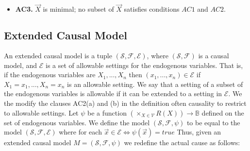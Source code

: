 \documentclass{article}
\begin{document}
\begin{definition}
\begin{itemize}
              (a) $(M,\vec u)\models \langle \vec X \leftarrow \vec x', \vec W \leftarrow \vec w' \rangle \neg \varphi$.

              (b) $(M,\vec u)\models[\vec X\leftarrow \vec x, \vec W' \leftarrow \vec w', \vec Z'\leftarrow \vec z^*]\varphi$ for all subsets $\vec W'$ of $\vec W$ and all subsets $Z'$ of $\vec Z$.

        \item  \textbf{AC3.} $\vec X$ is minimal; no subset of $\vec X$ satisfies conditions $AC1$ and $AC2$.
    \end{itemize}
\end{definition}

\subsection{Extended Causal Model}
An extended causal model is a tuple $(\mathcal{S},\mathcal{F},
    \mathcal{E})$, where $(\mathcal{S},\mathcal{F})$ is a causal model, and $\mathcal{E}$ is a set of allowable settings for the endogenous variables.
That is, if the endogenous variables are $X_1,...,X_n$ then
$(x_1,...,x_n) \in \mathcal{E}$ if $X_1 = x_1, ..., X_n=x_n$ is an
allowable setting.
We say that a setting of a subset of the endogenous variables is allowable if it can be extended to a setting in $\mathcal{E}$.
We the modify the clauses AC2(a) and (b) in the definition often
causality to restrict to allowable settings.
Let $\psi$ be a function $(\times_{X \in \mathcal{V}}R(X))\rightarrow \mathbb{B}$ defined on the set of endogenous variables.
We define the model $(\mathcal{S},\mathcal{F},\psi)$ to be equal
to the model $(\mathcal{S},\mathcal{F},\mathcal{E})$ where
for each $\vec x \in \mathcal{E} \iff \psi(\vec x) = true$
Thus, given an extended causal model $M = (\mathcal{S},\mathcal{F},\psi)$ we redefine the actual cause as follows:
\end{document}

